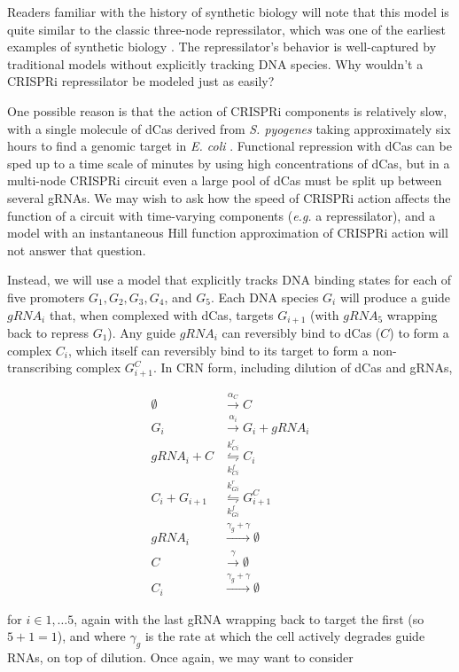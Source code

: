 \documentclass[preprint,12pt]{elsarticle}
\begin{document}
Readers familiar with the history of synthetic biology will note that this model is quite similar to the classic three-node repressilator, which was one of the earliest examples of synthetic biology \cite{Elowitz2000}. The repressilator's behavior is well-captured by traditional models without explicitly tracking DNA species. Why wouldn't a CRISPRi repressilator be modeled just as easily? 

One possible reason is that the action of CRISPRi components is relatively slow, with a single molecule of dCas derived from \textit{S. pyogenes} taking approximately six hours to find a genomic target in \textit{E. coli} \cite{Jones2017}. Functional repression with dCas can be sped up to a time scale of minutes by using high concentrations of dCas, but in a multi-node CRISPRi circuit even a large pool of dCas must be split up between several gRNAs. We may wish to ask how the speed of CRISPRi action affects the function of a circuit with time-varying components (\textit{e.g.} a repressilator), and a model with an instantaneous Hill function approximation of CRISPRi action will not answer that question. 

Instead, we will use a model that explicitly tracks DNA binding states for each of five promoters $G_1, G_2, G_3, G_4$, and $G_5$. Each DNA species $G_i$ will produce a guide $gRNA_i$ that, when complexed with dCas, targets $G_{i+1}$ (with $gRNA_5$ wrapping back to repress $G_1$). Any guide $gRNA_i$ can reversibly bind to dCas ($C$) to form a complex  $C_i$, which itself can reversibly bind to its target to form a non-transcribing complex $G_{i+1}^C$. In CRN form, including dilution of dCas and gRNAs,

\begin{align}
	\emptyset &\xrightarrow{\alpha_C} C\\
	G_i &\xrightarrow{\alpha_i} G_i + gRNA_i\\
	gRNA_i + C &\underset{k_{Ci}^f}{\overset{k_{Ci}^r}{\leftrightharpoons}} C_i\\
	\label{eq:casbindunbind} C_i + G_{i+1} &\underset{k_{Gi}^f}{\overset{k_{Gi}^r}{\leftrightharpoons}} G_{i+1}^C\\
	gRNA_i &\xrightarrow{\gamma_g + \gamma} \emptyset\\
	C &\xrightarrow{\gamma} \emptyset\\
	C_i &\xrightarrow{\gamma_g + \gamma} \emptyset
\end{align}

for $i\in{1,\dots 5}$, again with the last gRNA wrapping back to target the first (so $5+1=1$), and where $\gamma_g$ is the rate at which the cell actively degrades guide RNAs, on top of dilution. Once again, we may want to consider 
\end{document}
